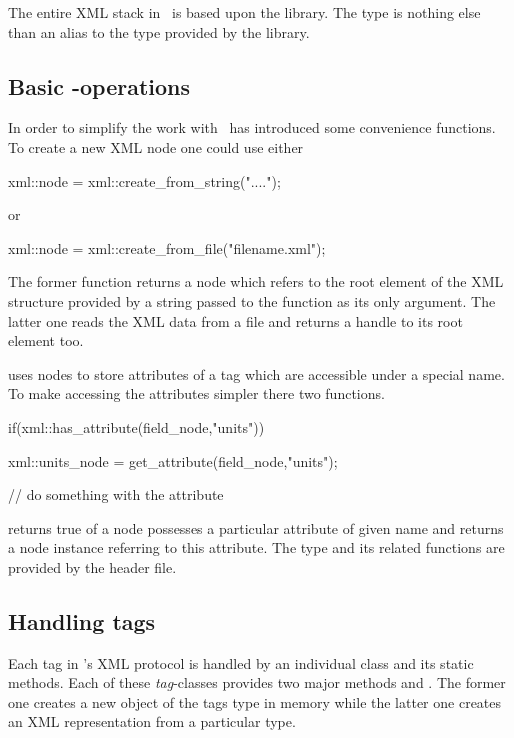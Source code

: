 {The entire XML stack in \libpniio\ is based upon the  
library. The  type is nothing else than an alias to
the  type provided by the  library.

\subsection{Basic -operations}

In order to simplify the work with  \libpniio\ has
introduced some convenience functions. 
To create a new XML node one could use either 
\begin{cppcode}
xml::node = xml::create_from_string("....");
\end{cppcode}
or
\begin{cppcode}
xml::node = xml::create_from_file("filename.xml");
\end{cppcode}
The former function returns a node which refers to the root element of the 
XML structure provided by a string passed to the function as its only argument. 
The latter one reads the XML data from a file and returns a handle to its 
root element too.

 uses nodes to store attributes of a tag which are 
accessible under a special name. To make accessing the attributes simpler 
there two functions.  
\begin{cppcode}
if(xml::has_attribute(field_node,"units"))
{
    xml::units_node = get_attribute(field_node,"units");

    // do something with the attribute
}
\end{cppcode}
 returns true of a node possesses a particular attribute of
given name and  returns a node instance referring to this 
attribute. 
The  type and its related functions are provided by the
 header file.

\subsection{Handling tags}

Each tag in \libpniio's XML protocol is handled by an individual class and its
static methods. Each of these \emph{tag}-classes provides two major methods 
 and . The former one creates a new
object of the tags type in memory while the latter one creates an XML
representation from a particular type.

}
